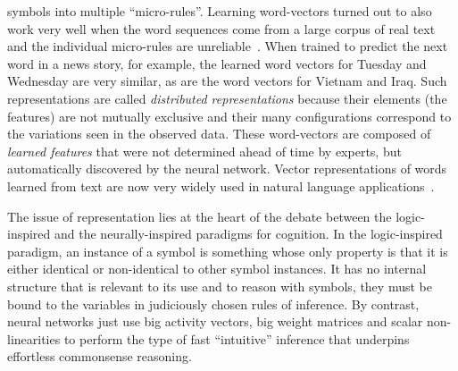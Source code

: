 \documentclass[10pts]{article}
\begin{document}
symbols into multiple ``micro-rules''.  
%
Learning word-vectors turned out to also
work very well when the word sequences come from a large corpus of
real text and the individual micro-rules are
unreliable~\citep{BenDucVin01-short}. When trained to predict the next
word in a news story, for example, the learned word vectors for
Tuesday and Wednesday are very similar, as are the word vectors for
Vietnam and Iraq. 
Such representations are called {\em
  distributed representations} because their elements (the features) are
not mutually exclusive and their many configurations
correspond to
the variations seen in the observed data.  These word-vectors are
composed of
{\em learned features} that were not determined ahead of time by
experts, but automatically discovered by the neural network.  Vector
representations of words learned from text are now very widely used in
natural language
applications~\citep{Schwenk-2007,collobert:2011b,Socher-2011,
  Mikolov-et-al-NIPS2013,Bahdanau-et-al-ICLR2015,Sutskever-et-al-NIPS2014}.

The issue of representation lies at the heart of the debate between
the logic-inspired and the neurally-inspired paradigms for
cognition. In the logic-inspired paradigm, an instance of a symbol is
something whose only property is that it is either identical or
non-identical to other symbol instances. It has no internal structure
that is relevant to its use and  to reason with symbols, they must be
bound to the variables in judiciously chosen rules of inference.  By
contrast, neural networks just use big activity vectors, big weight
matrices and scalar non-linearities to perform the type of fast
``intuitive'' inference that underpins effortless commonsense
reasoning.
\end{document}

